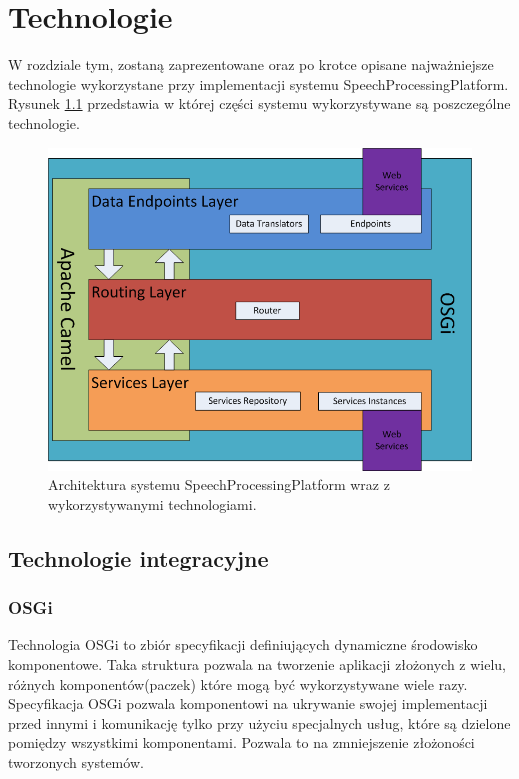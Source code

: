 \ifpdf
    \graphicspath{{3/figures/PNG/}{3/figures/PDF/}{3/figures/}}
\else
    \graphicspath{{3/figures/EPS/}{3/figures/}}
\fi
\chapter{Technologie} %


W rozdziale tym, zostaną zaprezentowane oraz po krotce opisane najważniejsze technologie wykorzystane przy implementacji systemu SpeechProcessingPlatform. Rysunek \ref{fig:architecture_and_technologies} przedstawia w której części systemu wykorzystywane są poszczególne technologie.

\begin{figure}[!h]
	\centering
	\includegraphics[scale=0.45]{layered_architecture_and_technologies.png} 
	\caption{Architektura systemu SpeechProcessingPlatform wraz z wykorzystywanymi technologiami.}
\label{fig:architecture_and_technologies}
\end{figure}

\section{Technologie integracyjne}
\subsection{OSGi}
Technologia OSGi to zbiór specyfikacji definiujących dynamiczne środowisko komponentowe. Taka struktura pozwala na tworzenie aplikacji złożonych z wielu, różnych komponentów(paczek) które mogą być wykorzystywane wiele razy. Specyfikacja OSGi pozwala komponentowi na ukrywanie swojej implementacji przed innymi i komunikację tylko przy użyciu specjalnych usług, które są dzielone pomiędzy wszystkimi komponentami. Pozwala to na zmniejszenie złożoności tworzonych systemów.


